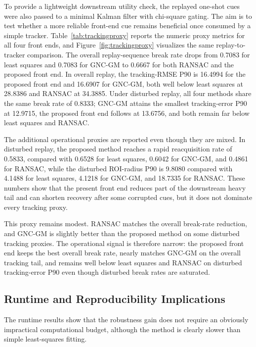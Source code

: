 \documentclass[drones,article,submit,pdftex,moreauthors]{Definitions/mdpi}
\begin{document}
\begin{samepage}
To provide a lightweight downstream utility check, the replayed one-shot cues were also passed to a minimal Kalman filter with chi-square gating. The aim is to test whether a more reliable front-end cue remains beneficial once consumed by a simple tracker. Table~\ref{tab:trackingproxy} reports the numeric proxy metrics for all four front ends, and Figure~\ref{fig:trackingproxy} visualizes the same replay-to-tracker comparison. The overall replay-sequence break rate drops from 0.7083 for least squares and 0.7083 for GNC-GM to 0.6667 for both RANSAC and the proposed front end. In overall replay, the tracking-RMSE P90 is 16.4994 for the proposed front end and 16.6907 for GNC-GM, both well below least squares at 28.8386 and RANSAC at 34.3885. Under disturbed replay, all four methods share the same break rate of 0.8333; GNC-GM attains the smallest tracking-error P90 at 12.9715, the proposed front end follows at 13.6756, and both remain far below least squares and RANSAC.
\end{samepage}

The additional operational proxies are reported even though they are mixed. In disturbed replay, the proposed method reaches a rapid reacquisition rate of 0.5833, compared with 0.6528 for least squares, 0.6042 for GNC-GM, and 0.4861 for RANSAC, while the disturbed ROI-radius P90 is 9.8080 compared with 4.1488 for least squares, 4.1218 for GNC-GM, and 18.7335 for RANSAC. These numbers show that the present front end reduces part of the downstream heavy tail and can shorten recovery after some corrupted cues, but it does not dominate every tracking proxy.

This proxy remains modest. RANSAC matches the overall break-rate reduction, and GNC-GM is slightly better than the proposed method on some disturbed tracking proxies. The operational signal is therefore narrow: the proposed front end keeps the best overall break rate, nearly matches GNC-GM on the overall tracking tail, and remains well below least squares and RANSAC on disturbed tracking-error P90 even though disturbed break rates are saturated.



\begin{samepage}
\subsection{Runtime and Reproducibility Implications}

The runtime results show that the robustness gain does not require an obviously impractical computational budget, although the method is clearly slower than simple least-squares fitting.
\end{samepage}
\end{document}

